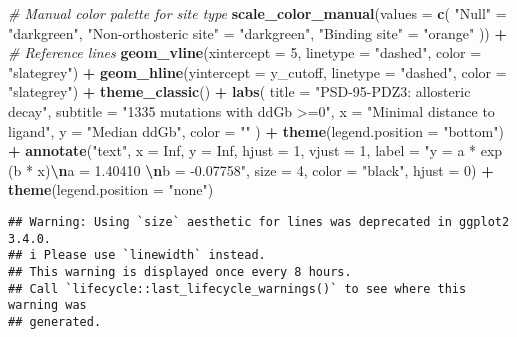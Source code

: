 \documentclass[
]{article}
\newenvironment{Shaded}{\begin{snugshade}}{\end{snugshade}}
\newcommand{\AttributeTok}[1]{\textcolor[rgb]{0.13,0.29,0.53}{#1}}
\newcommand{\CommentTok}[1]{\textcolor[rgb]{0.56,0.35,0.01}{\textit{#1}}}
\newcommand{\ConstantTok}[1]{\textcolor[rgb]{0.56,0.35,0.01}{#1}}
\newcommand{\DecValTok}[1]{\textcolor[rgb]{0.00,0.00,0.81}{#1}}
\newcommand{\FunctionTok}[1]{\textcolor[rgb]{0.13,0.29,0.53}{\textbf{#1}}}
\newcommand{\NormalTok}[1]{#1}
\newcommand{\OtherTok}[1]{\textcolor[rgb]{0.56,0.35,0.01}{#1}}
\newcommand{\SpecialCharTok}[1]{\textcolor[rgb]{0.81,0.36,0.00}{\textbf{#1}}}
\newcommand{\StringTok}[1]{\textcolor[rgb]{0.31,0.60,0.02}{#1}}
\begin{document}
\begin{Shaded}
\begin{Highlighting}[]
  \CommentTok{\# Manual color palette for site type}
  \FunctionTok{scale\_color\_manual}\NormalTok{(}\AttributeTok{values =} \FunctionTok{c}\NormalTok{(}
    \StringTok{"Null"} \OtherTok{=} \StringTok{"darkgreen"}\NormalTok{,}
    \StringTok{"Non{-}orthosteric site"} \OtherTok{=} \StringTok{"darkgreen"}\NormalTok{,}
    \StringTok{"Binding site"} \OtherTok{=} \StringTok{"orange"}
\NormalTok{  )) }\SpecialCharTok{+}
  \CommentTok{\# Reference lines}
  \FunctionTok{geom\_vline}\NormalTok{(}\AttributeTok{xintercept =} \DecValTok{5}\NormalTok{, }\AttributeTok{linetype =} \StringTok{"dashed"}\NormalTok{, }\AttributeTok{color =} \StringTok{"slategrey"}\NormalTok{) }\SpecialCharTok{+}
  \FunctionTok{geom\_hline}\NormalTok{(}\AttributeTok{yintercept =}\NormalTok{ y\_cutoff, }\AttributeTok{linetype =} \StringTok{"dashed"}\NormalTok{, }\AttributeTok{color =} \StringTok{"slategrey"}\NormalTok{) }\SpecialCharTok{+}
  \FunctionTok{theme\_classic}\NormalTok{() }\SpecialCharTok{+}
  \FunctionTok{labs}\NormalTok{(}
    \AttributeTok{title =} \StringTok{"PSD{-}95{-}PDZ3: allosteric decay"}\NormalTok{,}
    \AttributeTok{subtitle =} \StringTok{"1335 mutations with ddGb \textgreater{}=0"}\NormalTok{,}
    \AttributeTok{x =} \StringTok{"Minimal distance to ligand"}\NormalTok{,}
    \AttributeTok{y =} \StringTok{"Median ddGb"}\NormalTok{,}
    \AttributeTok{color =} \StringTok{""}
\NormalTok{  )  }\SpecialCharTok{+} \FunctionTok{theme}\NormalTok{(}\AttributeTok{legend.position =} \StringTok{"bottom"}\NormalTok{) }\SpecialCharTok{+}
    \FunctionTok{annotate}\NormalTok{(}\StringTok{"text"}\NormalTok{,  }\AttributeTok{x =} \ConstantTok{Inf}\NormalTok{, }\AttributeTok{y =} \ConstantTok{Inf}\NormalTok{,}
             \AttributeTok{hjust =} \DecValTok{1}\NormalTok{, }\AttributeTok{vjust =} \DecValTok{1}\NormalTok{,}
           \AttributeTok{label =} \StringTok{"y = a * exp (b * x)}\SpecialCharTok{\textbackslash{}n}\StringTok{a = 1.40410  }\SpecialCharTok{\textbackslash{}n}\StringTok{b = {-}0.07758"}\NormalTok{,}
           \AttributeTok{size =} \DecValTok{4}\NormalTok{, }\AttributeTok{color =} \StringTok{"black"}\NormalTok{, }\AttributeTok{hjust =} \DecValTok{0}\NormalTok{) }\SpecialCharTok{+} \FunctionTok{theme}\NormalTok{(}\AttributeTok{legend.position =} \StringTok{"none"}\NormalTok{)}
\end{Highlighting}
\end{Shaded}

\begin{verbatim}
## Warning: Using `size` aesthetic for lines was deprecated in ggplot2 3.4.0.
## i Please use `linewidth` instead.
## This warning is displayed once every 8 hours.
## Call `lifecycle::last_lifecycle_warnings()` to see where this warning was
## generated.
\end{verbatim}
\end{document}
